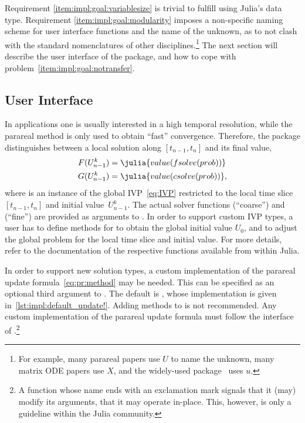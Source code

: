 Requirement \ref{item:impl:goal:variablesize} is trivial to fulfill using Julia's  data type.
Requirement \ref{item:impl:goal:modularity} imposes a non-specific naming scheme for
user interface functions and the name of the unknown,
as to not clash with the standard nomenclatures of other disciplines.\footnote{%
  For example,
  many parareal papers use $U$ to name the unknown,
  many matrix \ac{ODE} papers use $X$,
  and the widely-used  package~\cite{DifferentialEquations} uses $u$.
}
The next section will describe the user interface of the  package,
and how to cope with problem~\ref{item:impl:goal:notransfer}.

\subsection{User Interface}

In applications one is usually interested in a high temporal resolution,
while the parareal method is only used to obtain \enquote{fast} convergence.
Therefore, the  package distinguishes between a local solution along $[t_{n-1}, t_n]$ and its final value,
\begin{align*}
  F(U_{n-1}^k) &= \julia{value(fsolve(prob))} \\
  G(U_{n-1}^k) &= \julia{value(csolve(prob))}
  ,
\end{align*}
where  is an instance of the global \ac{IVP}~\eqref{eq:IVP}
restricted to the local time slice~$[t_{n-1}, t_n]$ and initial value~$U_{n-1}^k$.
The actual solver functions  (\enquote{coarse}) and  (\enquote{fine})
are provided as arguments to .
In order to support custom \ac{IVP} types,
a user has to define methods for  to obtain the global initial value $U_0$,
and  to adjust the global problem for the local time slice and initial value.
For more details, refer to the documentation of the respective functions available from within Julia.

In order to support new solution types,
a custom implementation of the parareal update formula~\eqref{eq:pr:method} may be needed.
This can be specified as an optional third argument to .
The default is ,
whose implementation is given in~\autoref{lst:impl:default_update!}.
Adding methods to  is not recommended.
Any custom implementation of the parareal update formula must follow the interface of .\footnote{%
  A function whose name ends with an exclamation mark signals that it (may) modify its arguments,
  \ie that it may operate in-place.
  This, however, is only a guideline within the Julia community.
}

